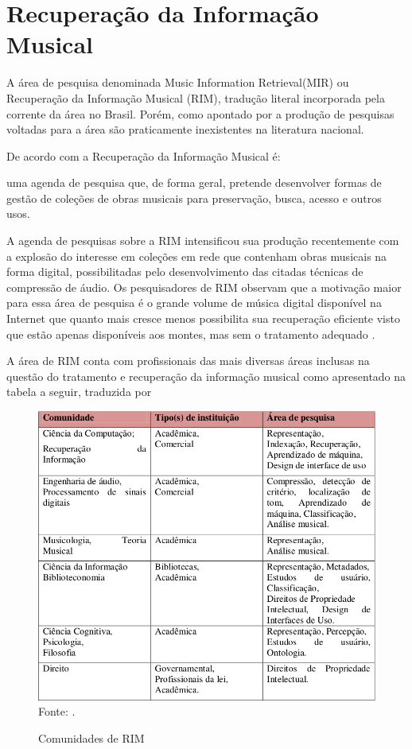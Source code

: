 \section{Recuperação da Informação Musical}

A área de pesquisa denominada Music Information Retrieval(MIR) ou Recuperação da Informação Musical (RIM), tradução literal incorporada pela corrente da área no Brasil. Porém, como apontado por  a produção de pesquisas voltadas para a área são praticamente inexistentes na literatura nacional.

De acordo com  a Recuperação da Informação Musical é:

\begin{citacao}
[...] uma agenda de pesquisa que, de forma geral, pretende desenvolver formas de gestão de coleções de obras musicais para preservação, busca, acesso e outros usos.
\end{citacao}

A agenda de pesquisas sobre a RIM intensificou sua produção recentemente com a explosão do interesse em coleções em rede que contenham obras musicais na forma digital, possibilitadas pelo desenvolvimento das citadas técnicas de compressão de áudio. Os pesquisadores de RIM observam que a motivação maior para essa área de pesquisa é o grande volume de música digital disponível na Internet que quanto mais cresce menos possibilita sua recuperação eficiente visto que estão apenas disponíveis aos montes, mas sem o tratamento adequado \cite{gomes2015}.

A área de RIM conta com profissionais das mais diversas áreas inclusas na questão do tratamento e recuperação da informação musical como apresentado na tabela a seguir, traduzida por 

\begin{figure}[!htb]
   \centering
   \caption{Comunidades de RIM}\label{fig:comunidadeRim} 
   \includegraphics[scale=0.4]{figuras/comunidadeRim.png}
   Fonte: \cite{futrelle&downie2002}.
\end{figure}

